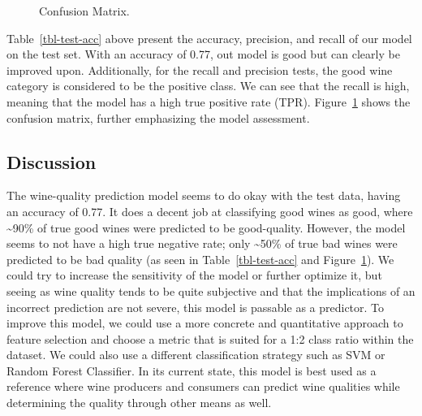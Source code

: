 \documentclass[
  letterpaper,
  DIV=11,
  numbers=noendperiod]{scrartcl}
\begin{document}
\begin{figure}


\caption{\label{fig-conf-mat}Confusion Matrix.}

\end{figure}%

Table~\ref{tbl-test-acc} above present the accuracy, precision, and
recall of our model on the test set. With an accuracy of 0.77, out model
is good but can clearly be improved upon. Additionally, for the recall
and precision tests, the good wine category is considered to be the
positive class. We can see that the recall is high, meaning that the
model has a high true positive rate (TPR). Figure~\ref{fig-conf-mat}
shows the confusion matrix, further emphasizing the model assessment.

\subsection{Discussion}\label{discussion}

The wine-quality prediction model seems to do okay with the test data,
having an accuracy of 0.77. It does a decent job at classifying good
wines as good, where \textasciitilde90\% of true good wines were
predicted to be good-quality. However, the model seems to not have a
high true negative rate; only \textasciitilde50\% of true bad wines were
predicted to be bad quality (as seen in Table~\ref{tbl-test-acc} and
Figure~\ref{fig-conf-mat}). We could try to increase the sensitivity of
the model or further optimize it, but seeing as wine quality tends to be
quite subjective and that the implications of an incorrect prediction
are not severe, this model is passable as a predictor. To improve this
model, we could use a more concrete and quantitative approach to feature
selection and choose a metric that is suited for a 1:2 class ratio
within the dataset. We could also use a different classification
strategy such as SVM or Random Forest Classifier. In its current state,
this model is best used as a reference where wine producers and
consumers can predict wine qualities while determining the quality
through other means as well.
\end{document}
